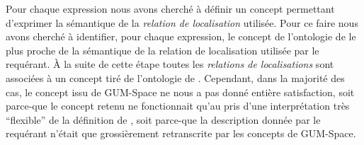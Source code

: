 Pour chaque expression nous avons cherché à définir un concept
permettant d'exprimer la sémantique de la \emph{relation de
  localisation} utilisée.
%
Pour ce faire nous avons cherché à identifier, pour chaque expression,
le concept de l'ontologie de \textcite{Bateman2010} le plus proche de
la sémantique de la relation de localisation utilisée par le
requérant.
%
À la suite de cette étape toutes les \emph{relations de localisations}
sont associées à un concept tiré de l'ontologie de
\textcite{Bateman2010}. Cependant, dans la majorité des cas, le
concept issu de GUM-Space ne nous a pas donné entière satisfaction,
soit parce-que le concept retenu ne fonctionnait qu'au pris d'une
interprétation très \enquote{flexible} de la définition de
\textcite{Bateman2010}, soit parce-que la description donnée par le
requérant n'était que grossièrement retranscrite par les concepts de
GUM-Space.


